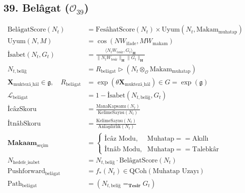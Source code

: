 \documentclass[11pt, a4paper]{article}
\begin{document}
\subsection{39. Belâgat ($\mathcal{O}_{39}$)}
\begin{align}
\text{BelâgatScore}(N_t) &= \text{FesâhatScore}(N_t) \times \text{Uyum}\left( N_t, \text{Makam}_{\text{muhatap}} \right) \\
\text{Uyum}(N, M) &= \cos(N W_{\text{ifade}}, M W_{\text{makam}}) \\
\text{İsabet}(N_t, G_t) &= \frac{\langle N_t W_{\text{tesir}}, G_t \rangle_{\mathbf{H}}}{\|N_t W_{\text{tesir}}\|_{\mathbf{H}} \|G_t\|_{\mathbf{H}}} \\
N_{t, \text{beliğ}} &= R_{\text{belâgat}} \triangleright (N_t \otimes_{\mathcal{O}} \text{Makam}_{\text{muhatap}}) \\
\mathbf{X}_{\text{muktezâ\_hâl}} \in \mathfrak{g}, \quad R_{\text{belâgat}} &= \exp(\theta \mathbf{X}_{\text{muktezâ\_hâl}}) \in G = \exp(\mathfrak{g}) \\
\mathcal{L}_{\text{belâgat}} &= 1 - \text{İsabet}(N_{t, \text{beliğ}}, G_t) \\
\text{İcâzSkoru} &= \frac{\text{ManaKapsamı}(N_t)}{\text{KelimeSayısı}(N_t)} \\
\text{İtnâbSkoru} &= \frac{\text{KelimeSayısı}(N_t)}{\text{Anlaşılırlık}(N_t)} \\
\mathbf{Makaam}_{\text{seçim}} &= 
\begin{cases}
\text{İcâz Modu}, & \text{Muhatap} == \text{Akıllı} \\
\text{İtnâb Modu}, & \text{Muhatap} == \text{Talebkâr}
\end{cases} \\
N_{\text{hedefe\_isabet}} &= N_{t, \text{beliğ}} \cdot \text{BelâgatScore}(N_t) \\
\text{Pushforward}_{\text{belâgat}} &= f_*(N_t) \in \text{QCoh}(\text{Muhatap Uzayı}) \\
\text{Path}_{\text{belâgat}} &= (N_{t, \text{beliğ}} =_{\mathbf{Tesir}} G_t)
\end{align}
\end{document}
